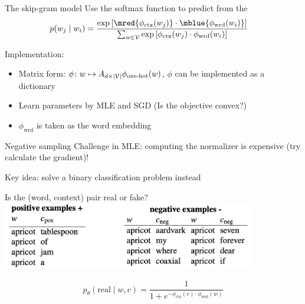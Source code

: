 \documentclass[usenames,dvipsnames,notes,11pt,aspectratio=169]{beamer}
\begin{document}
\begin{frame}
    {The skip-gram model}
    Use the softmax function to predict  from the 
    \begin{align*}
        p(w_j\mid w_i) %
        &= \frac{\exp\pb{\mred{\phi_{\text{ctx}}(w_j)}\cdot \mblue{\phi_{\text{wrd}}(w_i)}}}
        {\sum_{w\in\sV} \exp\pb{\phi_{\text{ctx}}(w_j)\cdot\phi_{\text{wrd}}(w_i)}}
    \end{align*}
    \pause

    \pause
    Implementation:\vspace{-1em}
    \begin{itemize}[<+->]
        \item Matrix form: $\phi\colon w \mapsto A_{d\times|\mathcal{V}|}\phi_{\text{one-hot}}(w)$,
        $\phi$ can be implemented as a dictionary
        \item Learn parameters by MLE and SGD (Is the objective convex?)
        \item $\phi_{\text{wrd}}$ is taken as the word embedding
    \end{itemize}
\end{frame}

\begin{frame}
    {Negative sampling}
    Challenge in MLE: computing the normalizer is expensive (try calculate the gradient)!
    \pause

    Key idea: solve a binary classification problem instead
    \begin{center}
        Is the (word, context) pair real or fake? \\
        \includegraphics[height=3cm]{figures/neg-sample}
    \end{center}
    $$
    p_\theta(\text{real} \mid w, c) = \frac{1}{1+e^{-\phi_{\text{ctx}}(c)\cdot\phi_{\text{wrd}}(w)}}
    $$
\end{frame}
\end{document}
